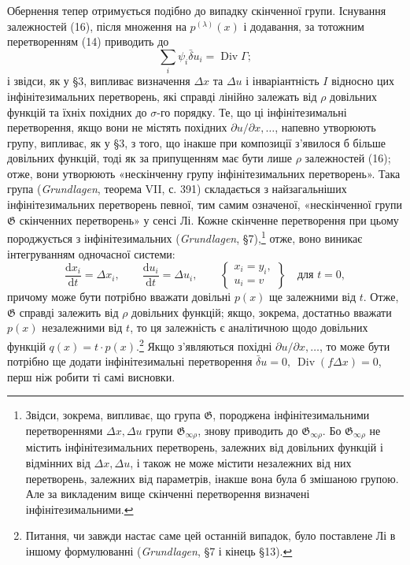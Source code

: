 \documentclass[11pt]{article}
\providecommand{\G}{\mathfrak G}
\providecommand{\D}{\Delta}
\providecommand{\p}{\partial}
\providecommand{\dd}{\mathrm d}
\DeclareMathOperator{\Div}{Div}
\providecommand{\bd}{\bar{\delta}}
\begin{document}
Обернення тепер отримується подібно до випадку скінченної групи. Існування залежностей (16), після множення на \(p^{(\lambda)}(x)\) і додавання, за тотожним перетворенням (14) приводить до
\[
\sum_i\psi_i\bd u_i=\Div\Gamma;
\]
і звідси, як у \S{}3, випливає визначення \(\D x\) та \(\D u\) і інваріантність \(I\) відносно цих інфінітезимальних перетворень, які справді лінійно залежать від \(\rho\) довільних функцій та їхніх похідних до \(\sigma\)-го порядку. Те, що ці інфінітезимальні перетворення, якщо вони не містять похідних \(\p u/\p x,\ldots\), напевно утворюють групу, випливає, як у \S{}3, з того, що інакше при композиції з'явилося б більше довільних функцій, тоді як за припущенням має бути лише \(\rho\) залежностей (16); отже, вони утворюють «нескінченну групу інфінітезимальних перетворень». Така група (\emph{Grundlagen}, теорема VII, с. 391) складається з найзагальніших інфінітезимальних перетворень певної, тим самим означеної, «нескінченної групи \(\G\) скінченних перетворень» у сенсі Лі. Кожне скінченне перетворення при цьому породжується з інфінітезимальних (\emph{Grundlagen}, \S{}7),\footnote{Звідси, зокрема, випливає, що група \(\G\), породжена інфінітезимальними перетвореннями \(\D x,\D u\) групи \(\G_{\infty\rho}\), знову приводить до \(\G_{\infty\rho}\). Бо \(\G_{\infty\rho}\) не містить інфінітезимальних перетворень, залежних від довільних функцій і відмінних від \(\D x,\D u\), і також не може містити незалежних від них перетворень, залежних від параметрів, інакше вона була б змішаною групою. Але за викладеним вище скінченні перетворення визначені інфінітезимальними.} отже, воно виникає інтегруванням одночасної системи:
\[
\frac{\dd x_i}{\dd t}=\D x_i,\qquad
\frac{\dd u_i}{\dd t}=\D u_i,\qquad
\left\{\begin{array}{l}
x_i=y_i,\\
u_i=v
\end{array}\right\}
\quad\text{для }t=0,
\]
причому може бути потрібно вважати довільні \(p(x)\) ще залежними від \(t\). Отже, \(\G\) справді залежить від \(\rho\) довільних функцій; якщо, зокрема, достатньо вважати \(p(x)\) незалежними від \(t\), то ця залежність є аналітичною щодо довільних функцій \(q(x)=t\cdot p(x)\).\footnote{Питання, чи завжди настає саме цей останній випадок, було поставлене Лі в іншому формулюванні (\emph{Grundlagen}, \S{}7 і кінець \S{}13).} Якщо з'являються похідні \(\p u/\p x,\ldots\), то може бути потрібно ще додати інфінітезимальні перетворення \(\bd u=0,\ \Div(f\D x)=0\), перш ніж робити ті самі висновки.
\end{document}

